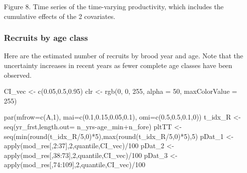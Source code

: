 \documentclass[11pt,]{article}
\newenvironment{Shaded}{}{}
\newcommand{\KeywordTok}[1]{\textcolor[rgb]{0.00,0.00,1.00}{#1}}
\newcommand{\DataTypeTok}[1]{#1}
\newcommand{\DecValTok}[1]{#1}
\newcommand{\FloatTok}[1]{#1}
\newcommand{\StringTok}[1]{\textcolor[rgb]{0.00,0.50,0.50}{#1}}
\newcommand{\OperatorTok}[1]{#1}
\newcommand{\NormalTok}[1]{#1}
\begin{document}
Figure 8. Time series of the time-varying productivity, which includes
the cumulative effects of the 2 covariates.

\subsubsection{Recruits by age class}\label{recruits-by-age-class}

Here are the estimated number of recruits by brood year and age. Note
that the uncertainty increases in recent years as fewer complete age
classes have been observed.

\begin{Shaded}
\begin{Highlighting}[]
\NormalTok{CI_vec <-}\StringTok{ }\KeywordTok{c}\NormalTok{(}\FloatTok{0.05}\NormalTok{,}\FloatTok{0.5}\NormalTok{,}\FloatTok{0.95}\NormalTok{)}
\NormalTok{clr <-}\StringTok{ }\KeywordTok{rgb}\NormalTok{(}\DecValTok{0}\NormalTok{, }\DecValTok{0}\NormalTok{, }\DecValTok{255}\NormalTok{, }\DataTypeTok{alpha =} \DecValTok{50}\NormalTok{, }\DataTypeTok{maxColorValue =} \DecValTok{255}\NormalTok{)}

\KeywordTok{par}\NormalTok{(}\DataTypeTok{mfrow=}\KeywordTok{c}\NormalTok{(A,}\DecValTok{1}\NormalTok{), }\DataTypeTok{mai=}\KeywordTok{c}\NormalTok{(}\FloatTok{0.1}\NormalTok{,}\FloatTok{0.15}\NormalTok{,}\FloatTok{0.05}\NormalTok{,}\FloatTok{0.1}\NormalTok{), }\DataTypeTok{omi=}\KeywordTok{c}\NormalTok{(}\FloatTok{0.5}\NormalTok{,}\FloatTok{0.5}\NormalTok{,}\FloatTok{0.1}\NormalTok{,}\DecValTok{0}\NormalTok{))}
\NormalTok{t_idx_R <-}\StringTok{ }\KeywordTok{seq}\NormalTok{(yr_frst,}\DataTypeTok{length.out=}\NormalTok{ n_yrs}\OperatorTok{-}\NormalTok{age_min}\OperatorTok{+}\NormalTok{n_fore)}
\NormalTok{pltTT <-}\StringTok{ }\KeywordTok{seq}\NormalTok{(}\KeywordTok{min}\NormalTok{(}\KeywordTok{round}\NormalTok{(t_idx_R}\OperatorTok{/}\DecValTok{5}\NormalTok{,}\DecValTok{0}\NormalTok{)}\OperatorTok{*}\DecValTok{5}\NormalTok{),}\KeywordTok{max}\NormalTok{(}\KeywordTok{round}\NormalTok{(t_idx_R}\OperatorTok{/}\DecValTok{5}\NormalTok{,}\DecValTok{0}\NormalTok{)}\OperatorTok{*}\DecValTok{5}\NormalTok{),}\DecValTok{5}\NormalTok{)}
\NormalTok{pDat_}\DecValTok{1}\NormalTok{ <-}\StringTok{ }\KeywordTok{apply}\NormalTok{(mod_res[,}\DecValTok{2}\OperatorTok{:}\DecValTok{37}\NormalTok{],}\DecValTok{2}\NormalTok{,quantile,CI_vec)}\OperatorTok{/}\DecValTok{100}
\NormalTok{pDat_}\DecValTok{2}\NormalTok{ <-}\StringTok{ }\KeywordTok{apply}\NormalTok{(mod_res[,}\DecValTok{38}\OperatorTok{:}\DecValTok{73}\NormalTok{],}\DecValTok{2}\NormalTok{,quantile,CI_vec)}\OperatorTok{/}\DecValTok{100}
\NormalTok{pDat_}\DecValTok{3}\NormalTok{ <-}\StringTok{ }\KeywordTok{apply}\NormalTok{(mod_res[,}\DecValTok{74}\OperatorTok{:}\DecValTok{109}\NormalTok{],}\DecValTok{2}\NormalTok{,quantile,CI_vec)}\OperatorTok{/}\DecValTok{100}


\end{Highlighting}
\end{Shaded}
\end{document}
